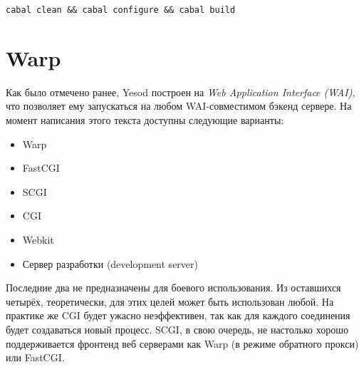 \begin{lstlisting}
cabal clean && cabal configure && cabal build
\end{lstlisting}

%
\section{Warp}
%
%
%

Как было отмечено ранее, Yesod построен на \emph{Web Application Interface (WAI)}, что позволяет ему запускаться на любом WAI-совместимом бэкенд сервере. На момент написания этого текста доступны следующие варианты:
\begin{itemize}
    \item Warp
    \item FastCGI
    \item SCGI
    \item CGI
    \item Webkit
    \item Сервер разработки (development server)
\end{itemize}

%
Последние два не предназначены для боевого %
использования. Из оставшихся четырёх, теоретически, для этих целей может быть использован любой. На практике же CGI будет ужасно неэффективен, так как для каждого соединения будет создаваться новый процесс. SCGI, в свою очередь, не настолько хорошо поддерживается фронтенд веб серверами как Warp (в режиме обратного прокси) или FastCGI.

